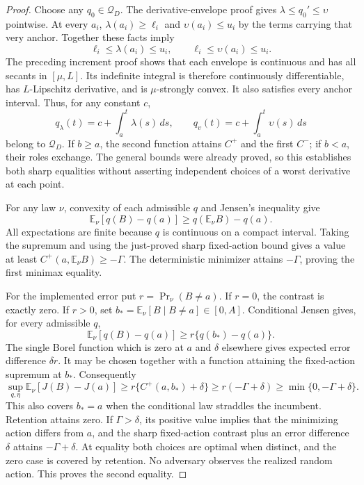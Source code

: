 \begin{proof}
Choose any $q_0\in\mathcal Q_D$. The derivative-envelope proof
gives $\lambda\le q_0'\le\upsilon$ pointwise. At every $a_i$,
$\lambda(a_i)\ge\ell_i$ and
$\upsilon(a_i)\le u_i$ by the terms carrying that very anchor.
Together these facts imply
\[
 \ell_i\le\lambda(a_i)\le u_i,
 \qquad \ell_i\le\upsilon(a_i)\le u_i.
\]
The preceding increment proof shows that each envelope is
continuous and has all secants in $[\mu,L]$. Its indefinite
integral is therefore continuously differentiable, has
$L$-Lipschitz derivative, and is $\mu$-strongly convex. It also
satisfies every anchor interval. Thus, for any constant $c$,
\[
 q_\lambda(t)=c+\int_a^t\lambda(s)\,ds,
 \qquad
 q_\upsilon(t)=c+\int_a^t\upsilon(s)\,ds
\]
belong to $\mathcal Q_D$. If $b\ge a$, the second function
attains $C^+$ and the first $C^-$; if $b<a$, their roles exchange.
The general bounds were already proved, so this establishes
both sharp equalities without asserting independent choices of
a worst derivative at each point.

For any law $\nu$, convexity of each admissible $q$ and Jensen's
inequality give
\[
 \mathbb E_\nu[q(B)-q(a)]
   \ge q(\mathbb E_\nu B)-q(a).
\]
All expectations are finite because $q$ is continuous on a compact
interval. Taking the supremum and using the just-proved sharp
fixed-action bound gives a value at least
$C^+(a,\mathbb E_\nu B)\ge-\Gamma$. The deterministic minimizer
attains $-\Gamma$, proving the first minimax equality.

For the implemented error put $r=\Pr_\nu(B\ne a)$. If $r=0$,
the contrast is exactly zero. If $r>0$, set
$b_*=\mathbb E_\nu[B\mid B\ne a]\in[0,A]$. Conditional Jensen
gives, for every admissible $q$,
\[
 \mathbb E_\nu[q(B)-q(a)]
 \ge r\{q(b_*)-q(a)\}.
\]
The single Borel function which is zero at $a$ and $\delta$
elsewhere gives expected error difference $\delta r$.
It may be chosen together with a function attaining the
fixed-action supremum at $b_*$. Consequently
\[
 \sup_{q,\eta}\mathbb E_\nu[J(B)-J(a)]
 \ge r\{C^+(a,b_*)+\delta\}
 \ge r(-\Gamma+\delta)
 \ge\min\{0,-\Gamma+\delta\}.
\]
This also covers $b_*=a$ when the conditional law straddles the
incumbent. Retention attains zero. If $\Gamma>\delta$, its
positive value implies that the minimizing action differs from
$a$, and the sharp fixed-action contrast plus an error difference
$\delta$ attains $-\Gamma+\delta$. At equality both choices are
optimal when distinct, and the zero case is covered by retention.
No adversary observes the realized random action. This proves
the second equality.
\end{proof}

